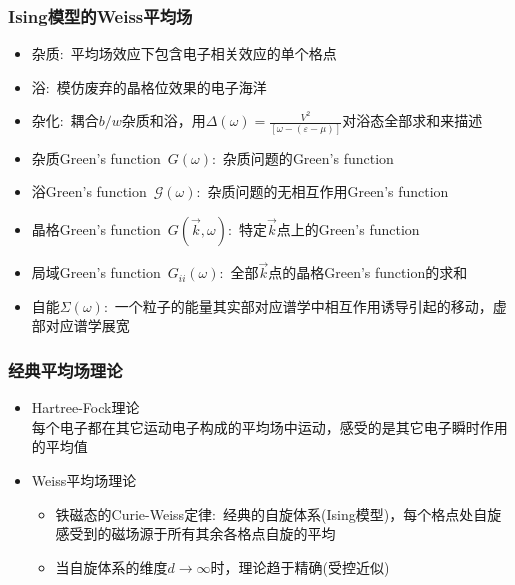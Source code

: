 {\frame
{
	\frametitle{\textrm{Ising}模型的\textrm{Weiss}平均场}
	\begin{itemize}
		\item 杂质:~平均场效应下包含电子相关效应的单个格点
		\item 浴:~模仿废弃的晶格位效果的电子海洋
		\item 杂化:~耦合$b/w$杂质和浴，用$\Delta(\omega)=\frac{V^2}{[\omega-(\varepsilon-\mu)]}$对浴态全部求和来描述
		\item 杂质\textrm{Green's function}~$G(\omega)$:~杂质问题的\textrm{Green's function}
		\item 浴\textrm{Green's function}~$\mathcal{G}(\omega)$:~杂质问题的无相互作用\textrm{Green's function}
		\item 晶格\textrm{Green's function}~$G(\vec k,\omega)$:~特定$\vec k$点上的\textrm{Green's function}
		\item 局域\textrm{Green's function}~$G_{ii}(\omega)$:~全部$\vec k$点的晶格\textrm{Green's function}的求和
		\item 自能$\Sigma(\omega)$:~一个粒子的能量其实部对应谱学中相互作用诱导引起的移动，虚部对应谱学展宽
	\end{itemize}
}

\frame
{
	\frametitle{经典平均场理论}
	\begin{itemize}
		\item \textrm{Hartree-Fock}理论\\
			每个电子都在其它运动电子构成的平均场中运动，感受的是其它电子瞬时作用的平均值
		\item \textrm{Weiss}平均场理论
			\begin{itemize}
				\item 铁磁态的\textrm{Curie-Weiss}定律:~经典的自旋体系(\textrm{Ising}模型)，每个格点处自旋感受到的磁场源于所有其余各格点自旋的平均
				\item 当自旋体系的维度$d\rightarrow\infty$时，理论趋于精确(受控近似)
			\end{itemize}
\end{itemize}
}

}
